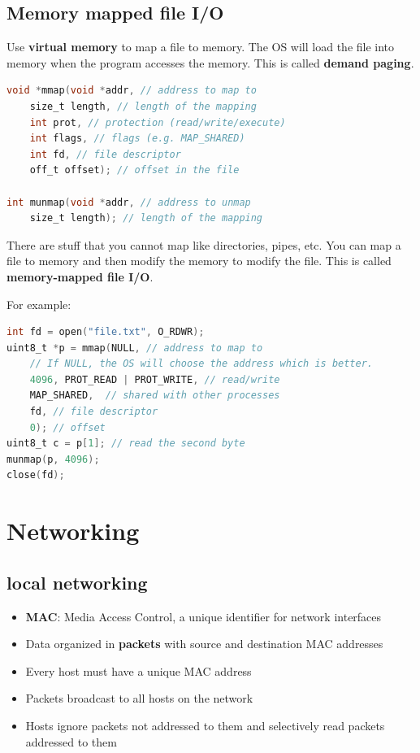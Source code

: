 \documentclass[letterpaper,12pt]{article}
\begin{document}
\subsection{Memory mapped file I/O}
Use \textbf{virtual memory} to map a file to memory. The OS will load the file into memory when the program accesses the memory. This is called \textbf{demand paging}.
\begin{lstlisting}[language=C]
void *mmap(void *addr, // address to map to
    size_t length, // length of the mapping
    int prot, // protection (read/write/execute)
    int flags, // flags (e.g. MAP_SHARED)
    int fd, // file descriptor
    off_t offset); // offset in the file

int munmap(void *addr, // address to unmap
    size_t length); // length of the mapping
\end{lstlisting}
There are stuff that you cannot map like directories, pipes, etc. You can map a file to memory and then modify the memory to modify the file. This is called \textbf{memory-mapped file I/O}.

For example: \begin{lstlisting}[language=C]
int fd = open("file.txt", O_RDWR);
uint8_t *p = mmap(NULL, // address to map to
    // If NULL, the OS will choose the address which is better.
    4096, PROT_READ | PROT_WRITE, // read/write
    MAP_SHARED,  // shared with other processes
    fd, // file descriptor
    0); // offset
uint8_t c = p[1]; // read the second byte
munmap(p, 4096);
close(fd);
\end{lstlisting}
\section{Networking}
\subsection{local networking}
\begin{itemize}
    \item \textbf{MAC}: Media Access Control, a unique identifier for network interfaces
    \item Data organized in \textbf{packets} with source and destination MAC addresses
    \item Every host must have a unique MAC address
    \item Packets broadcast to all hosts on the network
    \item Hosts ignore packets not addressed to them and selectively read packets addressed to them
\end{itemize}
\end{document}
